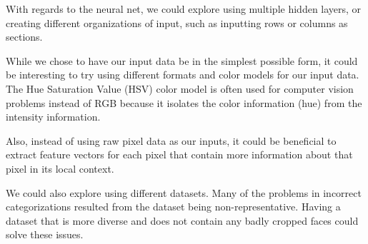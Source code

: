 \documentclass[11pt]{article}
\begin{document}
With regards to the neural net, we could explore using multiple hidden layers, or creating different organizations of input, such as inputting rows or columns as sections.

While we chose to have our input data be in the simplest possible form, it could be interesting to try using different formats and color models for our input data. The Hue Saturation Value (HSV) color model is often used for computer vision problems instead of RGB because it isolates the color information (hue) from the intensity information. 

Also, instead of using raw pixel data as our inputs, it could be beneficial to extract feature vectors for each pixel that contain more information about that pixel in its local context.

We could also explore using different datasets. Many of the problems in incorrect categorizations resulted from the dataset being non-representative. Having a dataset that is more diverse and does not contain any badly cropped faces could solve these issues.

 \newpage
\printbibliography
\end{document}
